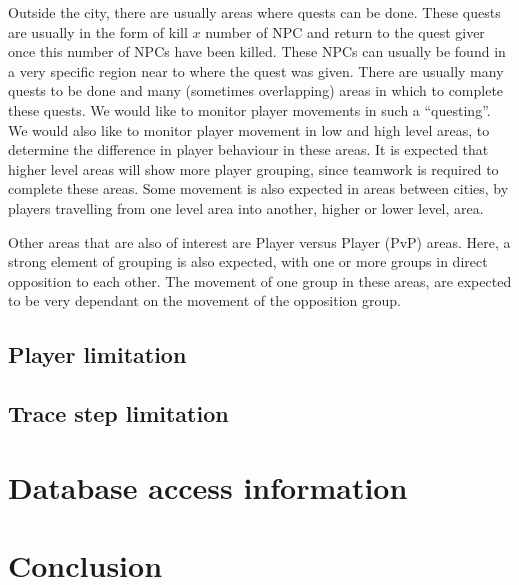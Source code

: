 \documentclass[journal,oneside,a4paper,onecolumn]{IEEEtran}
\begin{document}
Outside the city, there are usually areas where quests can be done. These quests are usually in the form of kill $x$ number of NPC and return to the
quest giver once this number of NPCs have been killed. These NPCs can usually be found in a very specific region near to where the quest was given.
There are usually many quests to be done and many (sometimes overlapping) areas in which to complete these quests. We would like to monitor player
movements in such a ``questing''. We would also like to monitor player movement in low and high level areas, to determine the difference in player
behaviour in these areas. It is expected that higher level areas will show more player grouping, since teamwork is required to complete these areas.
Some movement is also expected in areas between cities, by players travelling from one level area into another, higher or lower level, area.

Other areas that are also of interest are Player versus Player (PvP) areas. Here, a strong element of grouping is also expected, with one or more
groups in direct opposition to each other. The movement of one group in these areas, are expected to be very dependant on the movement of the
opposition group.

\subsection{Player limitation}

\subsection{Trace step limitation}

\section{Database access information}

\section{Conclusion}



\end{document}
